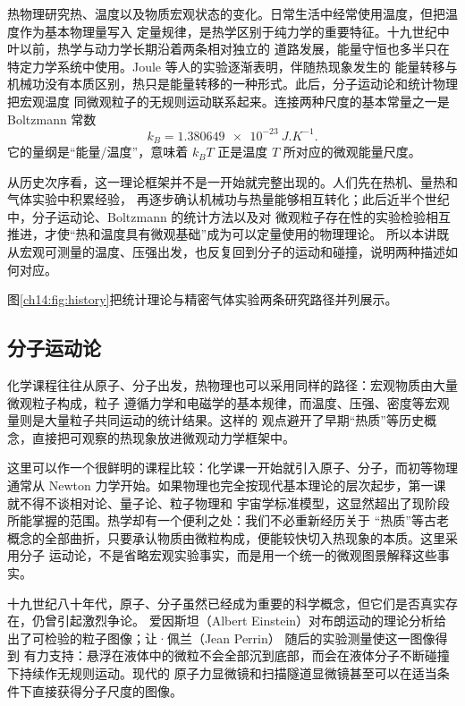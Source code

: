 热物理研究热、温度以及物质宏观状态的变化。日常生活中经常使用温度，但把温度作为基本物理量写入
定量规律，是热学区别于纯力学的重要特征。十九世纪中叶以前，热学与动力学长期沿着两条相对独立的
道路发展，能量守恒也多半只在特定力学系统中使用。Joule 等人的实验逐渐表明，伴随热现象发生的
能量转移与机械功没有本质区别，热只是能量转移的一种形式。此后，分子运动论和统计物理把宏观温度
同微观粒子的无规则运动联系起来。连接两种尺度的基本常量之一是 Boltzmann 常数
\begin{equation}
  \boxed{k_B=\SI{1.380649e-23}{J.K^{-1}}}.
\end{equation}
它的量纲是“能量/温度”，意味着 $k_BT$ 正是温度 $T$ 所对应的微观能量尺度。

从历史次序看，这一理论框架并不是一开始就完整出现的。人们先在热机、量热和气体实验中积累经验，
再逐步确认机械功与热量能够相互转化；此后近半个世纪中，分子运动论、Boltzmann 的统计方法以及对
微观粒子存在性的实验检验相互推进，才使“热和温度具有微观基础”成为可以定量使用的物理理论。
所以本讲既从宏观可测量的温度、压强出发，也反复回到分子的运动和碰撞，说明两种描述如何对应。

图\ref{ch14:fig:history}把统计理论与精密气体实验两条研究路径并列展示。
\boltzmannRayleighContext

\subsection{分子运动论}\label{ch14:sec:molecules}

化学课程往往从原子、分子出发，热物理也可以采用同样的路径：宏观物质由大量微观粒子构成，粒子
遵循力学和电磁学的基本规律，而温度、压强、密度等宏观量则是大量粒子共同运动的统计结果。这样的
观点避开了早期“热质”等历史概念，直接把可观察的热现象放进微观动力学框架中。

这里可以作一个很鲜明的课程比较：化学课一开始就引入原子、分子，而初等物理通常从 Newton
力学开始。如果物理也完全按现代基本理论的层次起步，第一课就不得不谈相对论、量子论、粒子物理和
宇宙学标准模型，这显然超出了现阶段所能掌握的范围。热学却有一个便利之处：我们不必重新经历关于
“热质”等古老概念的全部曲折，只要承认物质由微粒构成，便能较快切入热现象的本质。这里采用分子
运动论，不是省略宏观实验事实，而是用一个统一的微观图景解释这些事实。

十九世纪八十年代，原子、分子虽然已经成为重要的科学概念，但它们是否真实存在，仍曾引起激烈争论。
爱因斯坦（Albert Einstein）对布朗运动的理论分析给出了可检验的粒子图像；让·佩兰（Jean Perrin） 随后的实验测量使这一图像得到
有力支持：悬浮在液体中的微粒不会全部沉到底部，而会在液体分子不断碰撞下持续作无规则运动。现代的
原子力显微镜和扫描隧道显微镜甚至可以在适当条件下直接获得分子尺度的图像。

